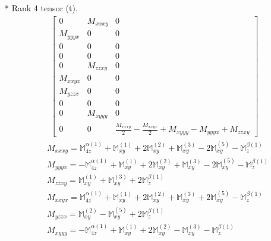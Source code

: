\documentclass[fleqn,8pt,landscape]{jsarticle}
\begin{document}
* Rank 4 tensor (t).
\begin{align*}
\begin{bmatrix} 0 & M_{xxxy} & 0 \\ M_{yyyx} & 0 & 0 \\ 0 & 0 & 0 \\ 0 & 0 & 0 \\ 0 & M_{zzxy} & 0 \\ M_{xxyx} & 0 & 0 \\ M_{yzzx} & 0 & 0 \\ 0 & 0 & 0 \\ 0 & M_{xyyy} & 0 \\ 0 & 0 & \frac{M_{xxxy}}{2} - \frac{M_{xxyx}}{2} + M_{xyyy} - M_{yyyx} + M_{zzxy} \end{bmatrix}
\end{align*}
\begin{align*}
& M_{xxxy} = \mathbb{M}_{4z}^{\alpha(1)} + \mathbb{M}_{xy}^{(1)} + 2 \mathbb{M}_{xy}^{(2)} + \mathbb{M}_{xy}^{(3)} - 2 \mathbb{M}_{xy}^{(5)} - \mathbb{M}_{z}^{\beta(1)} \\
& M_{yyyx} = - \mathbb{M}_{4z}^{\alpha(1)} + \mathbb{M}_{xy}^{(1)} + 2 \mathbb{M}_{xy}^{(2)} + \mathbb{M}_{xy}^{(3)} - 2 \mathbb{M}_{xy}^{(5)} - \mathbb{M}_{z}^{\beta(1)} \\
& M_{zzxy} = \mathbb{M}_{xy}^{(1)} + \mathbb{M}_{xy}^{(3)} + 2 \mathbb{M}_{z}^{\beta(1)} \\
& M_{xxyx} = \mathbb{M}_{4z}^{\alpha(1)} + \mathbb{M}_{xy}^{(1)} + 2 \mathbb{M}_{xy}^{(2)} + \mathbb{M}_{xy}^{(3)} + 2 \mathbb{M}_{xy}^{(5)} - \mathbb{M}_{z}^{\beta(1)} \\
& M_{yzzx} = \mathbb{M}_{xy}^{(2)} - \mathbb{M}_{xy}^{(5)} + 2 \mathbb{M}_{z}^{\beta(1)} \\
& M_{xyyy} = - \mathbb{M}_{4z}^{\alpha(1)} + \mathbb{M}_{xy}^{(1)} + 2 \mathbb{M}_{xy}^{(2)} - \mathbb{M}_{xy}^{(3)} - \mathbb{M}_{z}^{\beta(1)}
\end{align*}
\end{document}
